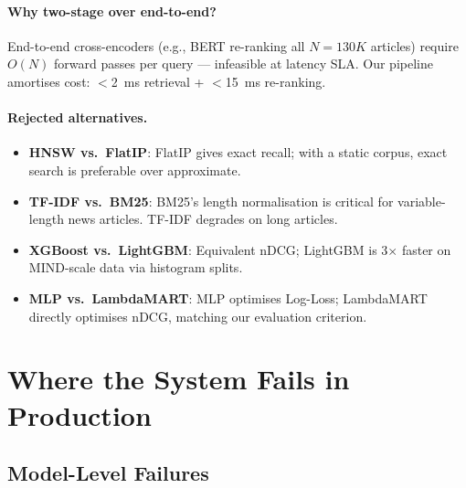 \documentclass[11pt,a4paper]{article}
\begin{document}
\paragraph{Why two-stage over end-to-end?} End-to-end cross-encoders (e.g.,
BERT re-ranking all $N{=}130K$ articles) require $O(N)$ forward passes per
query --- infeasible at latency SLA. Our pipeline amortises cost: $<$2~ms
retrieval + $<$15~ms re-ranking.

\paragraph{Rejected alternatives.}
\begin{itemize}[noitemsep]
  \item \textbf{HNSW vs.\ FlatIP}: FlatIP gives exact recall; with a static
        corpus, exact search is preferable over approximate.
  \item \textbf{TF-IDF vs.\ BM25}: BM25's length normalisation is critical for
        variable-length news articles. TF-IDF degrades on long articles.
  \item \textbf{XGBoost vs.\ LightGBM}: Equivalent nDCG; LightGBM is 3$\times$
        faster on MIND-scale data via histogram splits.
  \item \textbf{MLP vs.\ LambdaMART}: MLP optimises Log-Loss; LambdaMART
        directly optimises nDCG, matching our evaluation criterion.
\end{itemize}

\section{Where the System Fails in Production}

\subsection{Model-Level Failures}
\end{document}
